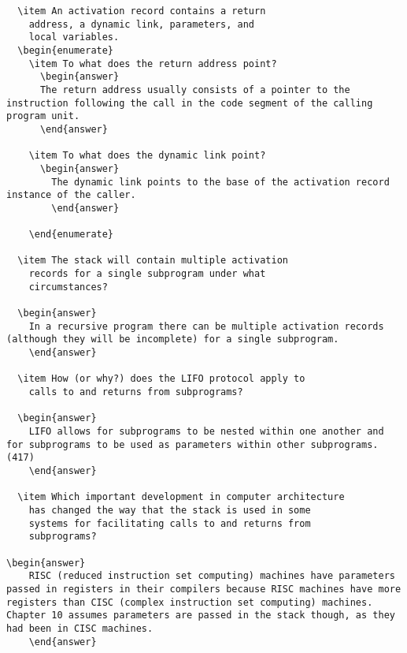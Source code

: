 \begin{enumerate}
\begin{answer}
\begin{lstlisting}
  \item An activation record contains a return
    address, a dynamic link, parameters, and
    local variables.
  \begin{enumerate}
    \item To what does the return address point?
      \begin{answer}
      The return address usually consists of a pointer to the instruction following the call in the code segment of the calling program unit.
      \end{answer}

    \item To what does the dynamic link point?
      \begin{answer}
        The dynamic link points to the base of the activation record instance of the caller.
        \end{answer}

    \end{enumerate}

  \item The stack will contain multiple activation
    records for a single subprogram under what
    circumstances?

  \begin{answer}
    In a recursive program there can be multiple activation records (although they will be incomplete) for a single subprogram.
    \end{answer}

  \item How (or why?) does the LIFO protocol apply to
    calls to and returns from subprograms?
  
  \begin{answer}
    LIFO allows for subprograms to be nested within one another and for subprograms to be used as parameters within other subprograms. (417)
    \end{answer}

  \item Which important development in computer architecture
    has changed the way that the stack is used in some
    systems for facilitating calls to and returns from
    subprograms?

\begin{answer}
    RISC (reduced instruction set computing) machines have parameters passed in registers in their compilers because RISC machines have more registers than CISC (complex instruction set computing) machines. Chapter 10 assumes parameters are passed in the stack though, as they had been in CISC machines.
    \end{answer}


\end{lstlisting}
\end{answer}
\end{enumerate}
